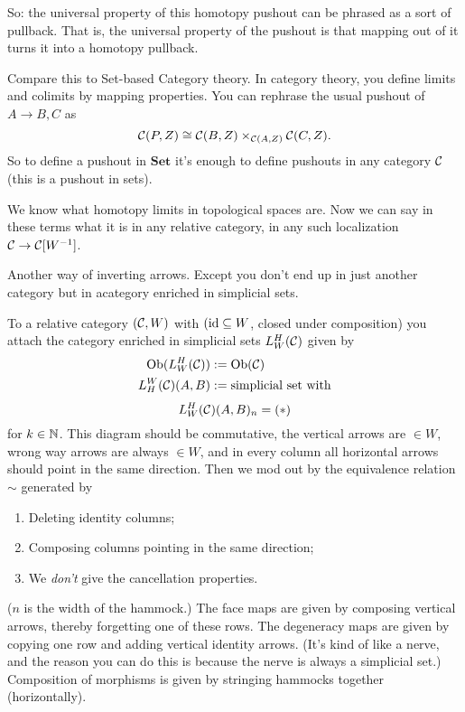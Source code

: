 \documentclass[class=report, crop=false,a4paper,twoside]{standalone}
\begin{document}
So: the universal property of this homotopy pushout can be phrased as a sort of pullback. That is, the universal property of the pushout is that mapping out of it turns it into a homotopy pullback.

Compare this to Set-based Category theory. In category theory, you define limits and colimits by mapping properties. You can rephrase the usual pushout of $A \to B,C$ as
\[
\mathcal{C}(P,Z) \cong \mathcal{C}(B,Z) \times_{\mathcal{C}(A,Z)} \mathcal{C}(C,Z). 
\]
So to define a pushout in $\mathbf{Set}$ it's enough to define pushouts in any category $\mathcal{C}$ (this is a pushout in sets). 

We know what homotopy limits in topological spaces are. Now we can say in these terms what it is in any relative category, in any such localization $\mathcal{C} \to \mathcal{C}[W^{-1}]$. 

\begin{definition}
	Another way of inverting arrows. Except you don't end up in just another category but in acategory enriched in simplicial sets.

	To a relative category $(\mathcal{C},W)$ with $(\operatorname{id} \subseteq W$, closed under composition) you attach the category enriched in simplicial sets $L^H_W(\mathcal{C})$ given by
	\begin{align*}
		\operatorname{Ob}(L^H_W(\mathcal{C})) &:= \operatorname{Ob}(\mathcal{C})\\
		L_H^W(\mathcal{C})(A,B) &:= \text{simplicial set with}
	\end{align*}
	\[
	L_W^H(\mathcal{C})(A,B)_n = (*)
	\]
	for $k \in \mathbb{N}$. This diagram should be commutative, the vertical arrows are $\in W$, wrong way arrows are always $\in W$, and in every column all horizontal arrows should point in the same direction. Then we mod out by the equivalence relation $\sim$ generated by
	\begin{enumerate}
		\item Deleting identity columns;
		\item Composing columns pointing in the same direction;
		\item We \emph{don't} give the cancellation properties. 
	\end{enumerate}
	($n$ is the width of the hammock.)
	The face maps are given by composing vertical arrows, thereby forgetting one of these rows.
	The degeneracy maps are given by copying one row and adding vertical identity arrows.
	(It's kind of like a nerve, and the reason you can do this is because the nerve is always a simplicial set.)
	Composition of morphisms is given by stringing hammocks together (horizontally). 
\end{definition}
\end{document}
